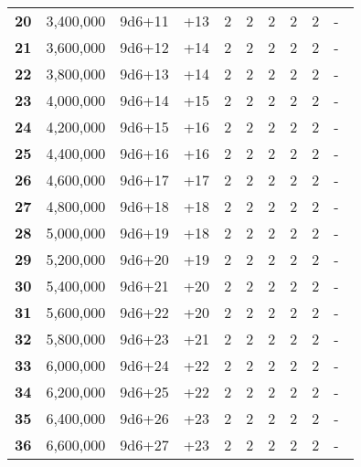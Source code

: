 \begin {table}[H]
\begin{tabularx}{\columnwidth}{>{\bfseries}cccM{.31in}M{.51in}M{.25in}M{.43in}M{.32in}M{.45in}Y}
		20 & 3,400,000 & 9d6+11 & +13 & 2 & 2 & 2 & 2 & 2 & -\\
		21 & 3,600,000 & 9d6+12 & +14 & 2 & 2 & 2 & 2 & 2 & -\\
		22 & 3,800,000 & 9d6+13 & +14 & 2 & 2 & 2 & 2 & 2 & -\\
		23 & 4,000,000 & 9d6+14 & +15 & 2 & 2 & 2 & 2 & 2 & -\\
		24 & 4,200,000 & 9d6+15 & +16 & 2 & 2 & 2 & 2 & 2 & -\\
		25 & 4,400,000 & 9d6+16 & +16 & 2 & 2 & 2 & 2 & 2 & -\\
		26 & 4,600,000 & 9d6+17 & +17 & 2 & 2 & 2 & 2 & 2 & -\\
		27 & 4,800,000 & 9d6+18 & +18 & 2 & 2 & 2 & 2 & 2 & -\\
		28 & 5,000,000 & 9d6+19 & +18 & 2 & 2 & 2 & 2 & 2 & -\\
		29 & 5,200,000 & 9d6+20 & +19 & 2 & 2 & 2 & 2 & 2 & -\\
		30 & 5,400,000 & 9d6+21 & +20 & 2 & 2 & 2 & 2 & 2 & -\\
		31 & 5,600,000 & 9d6+22 & +20 & 2 & 2 & 2 & 2 & 2 & -\\
		32 & 5,800,000 & 9d6+23 & +21 & 2 & 2 & 2 & 2 & 2 & -\\
		33 & 6,000,000 & 9d6+24 & +22 & 2 & 2 & 2 & 2 & 2 & -\\
		34 & 6,200,000 & 9d6+25 & +22 & 2 & 2 & 2 & 2 & 2 & -\\
		35 & 6,400,000 & 9d6+26 & +23 & 2 & 2 & 2 & 2 & 2 & -\\
		36 & 6,600,000 & 9d6+27 & +23 & 2 & 2 & 2 & 2 & 2 & -\
  \end {tabularx}
\end {table}
\newpage
